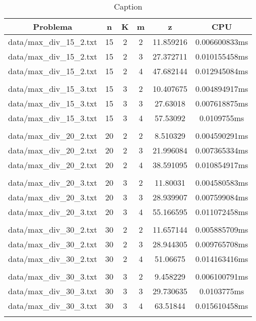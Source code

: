 \begin{table}[h]
\centering
\begin{tabular}{|c|c|c|c|c|c|}
\hline
Problema &  n &  K &  m &  z &  CPU \\
\hline
data/max\_div\_15\_2.txt &  15 &  2 &  2 &  11.859216 &  0.006600833ms \\
data/max\_div\_15\_2.txt &  15 &  2 &  3 &  27.372711 &  0.010155458ms \\
data/max\_div\_15\_2.txt &  15 &  2 &  4 &  47.682144 &  0.012945084ms \\
 \\
data/max\_div\_15\_3.txt &  15 &  3 &  2 &  10.407675 &  0.004894917ms \\
data/max\_div\_15\_3.txt &  15 &  3 &  3 &  27.63018 &  0.007618875ms \\
data/max\_div\_15\_3.txt &  15 &  3 &  4 &  57.53092 &  0.0109755ms \\
 \\
data/max\_div\_20\_2.txt &  20 &  2 &  2 &  8.510329 &  0.004590291ms \\
data/max\_div\_20\_2.txt &  20 &  2 &  3 &  21.996084 &  0.007365334ms \\
data/max\_div\_20\_2.txt &  20 &  2 &  4 &  38.591095 &  0.010854917ms \\
 \\
data/max\_div\_20\_3.txt &  20 &  3 &  2 &  11.80031 &  0.004580583ms \\
data/max\_div\_20\_3.txt &  20 &  3 &  3 &  28.939907 &  0.007599084ms \\
data/max\_div\_20\_3.txt &  20 &  3 &  4 &  55.166595 &  0.011072458ms \\
 \\
data/max\_div\_30\_2.txt &  30 &  2 &  2 &  11.657144 &  0.005885709ms \\
data/max\_div\_30\_2.txt &  30 &  2 &  3 &  28.944305 &  0.009765708ms \\
data/max\_div\_30\_2.txt &  30 &  2 &  4 &  51.06675 &  0.014163416ms \\
 \\
data/max\_div\_30\_3.txt &  30 &  3 &  2 &  9.458229 &  0.006100791ms \\
data/max\_div\_30\_3.txt &  30 &  3 &  3 &  29.730635 &  0.0103775ms \\
data/max\_div\_30\_3.txt &  30 &  3 &  4 &  63.51844 &  0.015610458ms \\
 \\
\hline
\end{tabular}
\caption{Caption}
\label{tab:my_table}
\end{table}